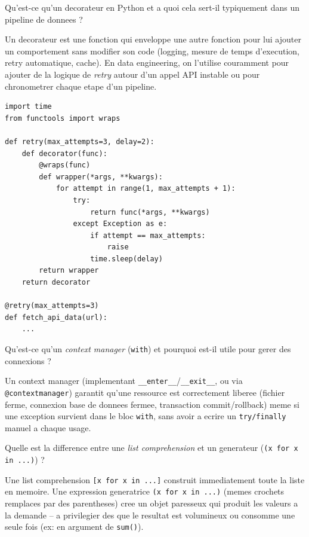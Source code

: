 \documentclass[11pt,a4paper]{article}
\begin{document}
\begin{question} Qu'est-ce qu'un decorateur en Python et a quoi cela sert-il typiquement dans un pipeline de donnees ?
\end{question}
\begin{reponse}
Un decorateur est une fonction qui enveloppe une autre fonction pour lui ajouter un comportement sans modifier son code (logging, mesure de temps d'execution, retry automatique, cache). En data engineering, on l'utilise couramment pour ajouter de la logique de \emph{retry} autour d'un appel API instable ou pour chronometrer chaque etape d'un pipeline.
\end{reponse}

\begin{lstlisting}
import time
from functools import wraps

def retry(max_attempts=3, delay=2):
    def decorator(func):
        @wraps(func)
        def wrapper(*args, **kwargs):
            for attempt in range(1, max_attempts + 1):
                try:
                    return func(*args, **kwargs)
                except Exception as e:
                    if attempt == max_attempts:
                        raise
                    time.sleep(delay)
        return wrapper
    return decorator

@retry(max_attempts=3)
def fetch_api_data(url):
    ...
\end{lstlisting}

\begin{question} Qu'est-ce qu'un \emph{context manager} (\texttt{with}) et pourquoi est-il utile pour gerer des connexions ?
\end{question}
\begin{reponse}
Un context manager (implementant \texttt{\_\_enter\_\_}/\texttt{\_\_exit\_\_}, ou via \texttt{@contextmanager}) garantit qu'une ressource est correctement liberee (fichier ferme, connexion base de donnees fermee, transaction commit/rollback) meme si une exception survient dans le bloc \texttt{with}, sans avoir a ecrire un \texttt{try/finally} manuel a chaque usage.
\end{reponse}

\begin{question} Quelle est la difference entre une \emph{list comprehension} et un generateur (\texttt{(x for x in ...)}) ?
\end{question}
\begin{reponse}
Une list comprehension \texttt{[x for x in ...]} construit immediatement toute la liste en memoire. Une expression generatrice \texttt{(x for x in ...)} (memes crochets remplaces par des parentheses) cree un objet paresseux qui produit les valeurs a la demande -- a privilegier des que le resultat est volumineux ou consomme une seule fois (ex: en argument de \texttt{sum()}).
\end{reponse}
\end{document}
